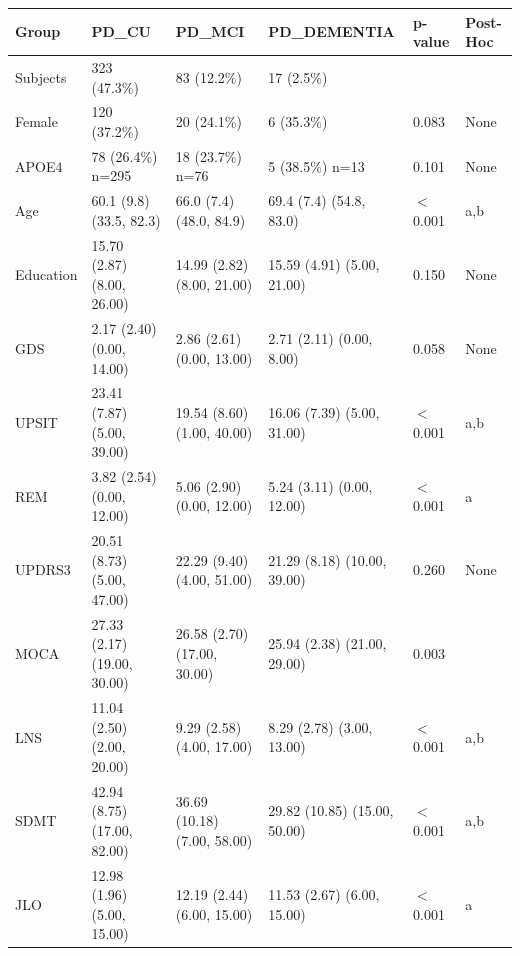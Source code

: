 \documentclass[1pt]{article}
\begin{document}
\begin{landscape}
\begin{tabular}{llllll}
	\toprule
	Group &                              PD\_CU &                             PD\_MCI &                        PD\_DEMENTIA &   p-value & Post-Hoc \\
	\midrule
	Subjects &                        323 (47.3\%) &                         83 (12.2\%) &                          17 (2.5\%) &           &          \\
	Female &                        120 (37.2\%) &                         20 (24.1\%) &                          6 (35.3\%) &     0.083 &     None \\
	APOE4 &                   78 (26.4\%) n=295 &                    18 (23.7\%) n=76 &                     5 (38.5\%) n=13 &     0.101 &     None \\
	Age &            60.1 (9.8) (33.5, 82.3) &            66.0 (7.4) (48.0, 84.9) &            69.4 (7.4) (54.8, 83.0) & $<$ 0.001 &      a,b \\
	Education &         15.70 (2.87) (8.00, 26.00) &         14.99 (2.82) (8.00, 21.00) &         15.59 (4.91) (5.00, 21.00) &     0.150 &     None \\
	GDS &          2.17 (2.40) (0.00, 14.00) &          2.86 (2.61) (0.00, 13.00) &           2.71 (2.11) (0.00, 8.00) &     0.058 &     None \\
	UPSIT &         23.41 (7.87) (5.00, 39.00) &         19.54 (8.60) (1.00, 40.00) &         16.06 (7.39) (5.00, 31.00) & $<$ 0.001 &      a,b \\
	REM &          3.82 (2.54) (0.00, 12.00) &          5.06 (2.90) (0.00, 12.00) &          5.24 (3.11) (0.00, 12.00) & $<$ 0.001 &        a \\
	UPDRS3 &         20.51 (8.73) (5.00, 47.00) &         22.29 (9.40) (4.00, 51.00) &        21.29 (8.18) (10.00, 39.00) &     0.260 &     None \\
	MOCA &        27.33 (2.17) (19.00, 30.00) &        26.58 (2.70) (17.00, 30.00) &        25.94 (2.38) (21.00, 29.00) &     0.003 &          \\
	LNS &         11.04 (2.50) (2.00, 20.00) &          9.29 (2.58) (4.00, 17.00) &          8.29 (2.78) (3.00, 13.00) & $<$ 0.001 &      a,b \\
	SDMT &        42.94 (8.75) (17.00, 82.00) &        36.69 (10.18) (7.00, 58.00) &       29.82 (10.85) (15.00, 50.00) & $<$ 0.001 &      a,b \\
	JLO &         12.98 (1.96) (5.00, 15.00) &         12.19 (2.44) (6.00, 15.00) &         11.53 (2.67) (6.00, 15.00) & $<$ 0.001 &        a \\

\end{tabular}
\end{landscape}
\end{document}
